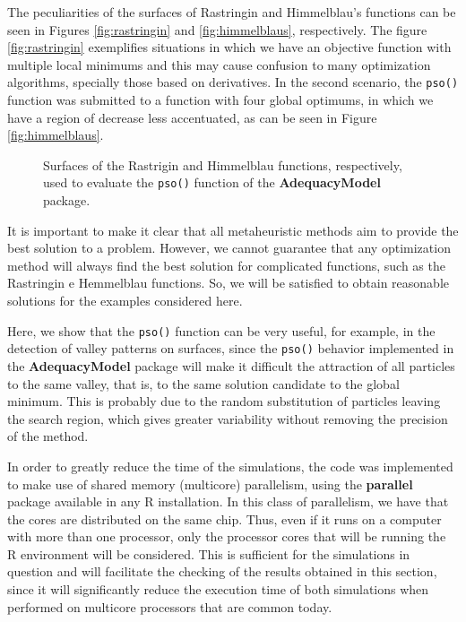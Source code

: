 \documentclass[10pt,letterpaper]{article}
\begin{document}
The peculiarities of the surfaces of Rastringin and Himmelblau's functions can be seen in Figures \ref{fig:rastringin} and \ref{fig:himmelblaus}, respectively. The figure \ref{fig:rastringin} exemplifies situations in which we have an objective function with multiple local minimums and this may cause confusion to many optimization algorithms, specially those based on derivatives. In the second scenario, the \texttt{pso()} function was submitted to a function with four global optimums, in which we have a region of decrease less accentuated, as can be seen in Figure \ref{fig:himmelblaus}.
\begin{figure}[H]
	\centering
	\subfigure{
		\label{fig:rastringin}
	}
	\subfigure{
		\label{fig:himmelblaus}
	}
	
	\caption{Surfaces of the Rastrigin and Himmelblau functions, respectively, used to evaluate the \texttt{pso()} function of the \textbf{AdequacyModel} package.}
\end{figure}


It is important to make it clear that all metaheuristic methods aim to provide the best solution to a problem. However, we cannot guarantee that any optimization method will always find the best solution for complicated functions, such as the  Rastringin e Hemmelblau functions. So, we will be satisfied to obtain reasonable solutions for the examples considered here.

Here, we show that the \texttt{pso()} function can be very useful, for example, in the detection of valley patterns on surfaces, since the \texttt{pso()} behavior implemented in the \textbf{AdequacyModel} package will make it difficult the attraction of all particles to the same valley, that is, to the same solution candidate to the global minimum. This is probably due to the random substitution of particles leaving the search region, which gives greater variability without removing the precision of the method.
 
In order to greatly reduce the time of the simulations, the code was implemented to make use of shared memory (multicore) parallelism, using the \textbf{parallel} package available in any \textsc{R} installation. In this class of parallelism, we have that the cores are distributed on the same chip. Thus, even if it runs on a computer with more than one processor, only the processor cores that will be running the \textsc{R} environment will be considered. This is sufficient for the simulations in question and will facilitate the checking of the results obtained in this section, since it will significantly reduce the execution time of both simulations when performed on multicore processors that are common today.
  
\end{document}
